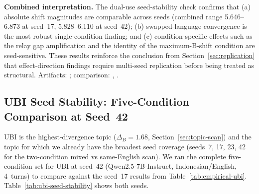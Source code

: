\documentclass{article}
\begin{document}
\textbf{Combined interpretation.} The dual-use seed-stability check confirms that (a) absolute shift magnitudes are comparable across seeds (combined range 5.646--6.873 at seed~17, 5.828--6.110 at seed~42); (b) swapped-language convergence is the most robust single-condition finding; and (c) condition-specific effects such as the relay gap amplification and the identity of the maximum-B-shift condition are seed-sensitive. These results reinforce the conclusion from Section~\ref{sec:replication} that effect-direction findings require multi-seed replication before being treated as structural. Artifacts: ; comparison: , .

\subsection{UBI Seed Stability: Five-Condition Comparison at Seed~42}
\label{sec:ubi-seed-stability}

UBI is the highest-divergence topic ($\Delta_B=1.68$, Section~\ref{sec:topic-scan}) and the topic for which we already have the broadest seed coverage (seeds~7, 17, 23, 42 for the two-condition mixed vs same-English scan). We ran the complete five-condition set for UBI at seed~42 (Qwen2.5-7B-Instruct, Indonesian/English, 4~turns) to compare against the seed~17 results from Table~\ref{tab:empirical-ubi}. Table~\ref{tab:ubi-seed-stability} shows both seeds.

\begin{table}[h]
\centering
\caption{UBI five-condition comparison across seeds 17 and 42 (Qwen2.5-7B-Instruct, Indonesian/English, 4~turns). Shift is L2 distance in 8D Schwartz space; gap is L2 distance between final private probe and observer readout.}
\label{tab:ubi-seed-stability}
\end{table}
\end{document}
